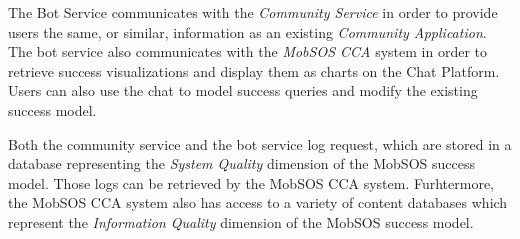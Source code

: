 The Bot Service communicates with the \emph{Community Service} in order to provide users the same, or similar, information as an existing \emph{Community Application}. The bot service also communicates with the \emph{MobSOS CCA} system in order to retrieve success visualizations and display them as charts on the Chat Platform. Users can also use the chat to model success queries and modify the existing success model.

Both the community service and the bot service log request, which are stored in a database representing the \emph{System Quality} dimension of the MobSOS success model. Those logs can be retrieved by the MobSOS CCA system. Furhtermore, the MobSOS CCA system also has access to a variety of content databases which represent the \emph{Information Quality} dimension of the MobSOS success model.
